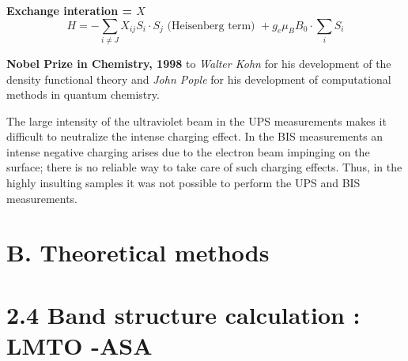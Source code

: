 \noindent
{\bf Exchange interation = \boldmath$X$}
$$
H=-\sum\limits_{i\neq J}X_{ij}S_{i}\cdot S_{j} \text{ (Heisenberg term) }+g_{e}\mu_{B}B_{0}\cdot \sum\limits_{i}S_{i}
$$

\noindent
{\bf Nobel Prize in Chemistry, 1998} to {\em Walter Kohn} for his development of the density functional theory and {\em John Pople} for his development of computational methods in quantum chemistry.

The large intensity of the ultraviolet beam in the UPS measurements makes it difficult to neutralize the intense charging effect. In the BIS measurements an intense negative charging arises due to the electron beam impinging on the surface; there is no reliable way to take care of such charging effects. Thus, in the highly insulting samples it was not possible to perform the UPS and BIS measurements.

\section*{B. Theoretical methods}

\section*{2.4 Band structure calculation : LMTO -ASA}

